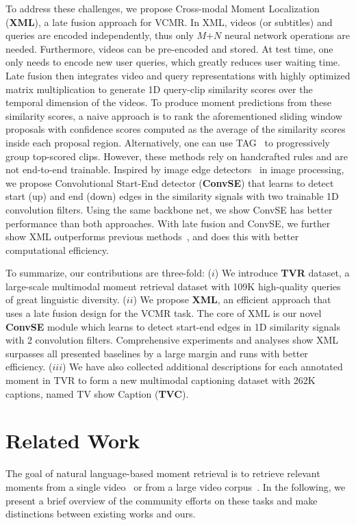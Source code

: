 \documentclass[runningheads]{llncs}
\begin{document}
To address these challenges, we propose Cross-modal Moment Localization (\textbf{XML}), a late fusion approach for VCMR. In XML, videos (or subtitles) and queries are encoded independently, thus only $M\mbox{+}N$ neural network operations are needed. 
Furthermore, videos can be pre-encoded and stored. At test time, one only needs to encode new user queries, which greatly reduces user waiting time. Late fusion then integrates video and query representations with highly optimized matrix multiplication to generate 1D query-clip similarity scores over the temporal dimension of the videos. To produce moment predictions from these similarity scores, a naive approach is to rank the aforementioned sliding window proposals with confidence scores computed as the average of the similarity scores inside each proposal region. 
Alternatively, one can use TAG~\cite{zhao2017temporal} to progressively group top-scored clips. 
However, these methods rely on handcrafted rules and are not end-to-end trainable.
Inspired by image edge detectors~\cite{szeliski2010computer} in image processing, we propose Convolutional Start-End detector (\textbf{ConvSE}) that learns to detect start (up) and end (down) edges in the similarity signals with two trainable 1D convolution filters. 
Using the same backbone net, we show ConvSE has better performance than both approaches.
With late fusion and ConvSE, we further show XML outperforms previous methods~\cite{anne2017localizing,escorcia2019temporal,ghosh2019excl}, and does this with better computational efficiency. 


To summarize, our contributions are three-fold: 
($i$) We introduce \textbf{TVR} dataset, a large-scale multimodal moment retrieval dataset with 109K high-quality queries of great linguistic diversity.
($ii$) We propose \textbf{XML}, an efficient approach that uses a late fusion design for the VCMR task. The core of XML is our novel \textbf{ConvSE} module which learns to detect start-end edges in 1D similarity signals with 2 convolution filters. Comprehensive experiments and analyses show XML surpasses all presented baselines by a large margin and runs with better efficiency. 
($iii$) We have also collected additional descriptions for each annotated moment in TVR to form a new multimodal captioning dataset with 262K captions, named TV show Caption (\textbf{TVC}).
 \section{Related Work}\label{related_work}
The goal of natural language-based moment retrieval is to retrieve relevant moments from a single video~\cite{anne2017localizing,gao2017tall} or from a large video corpus~\cite{escorcia2019temporal}. 
In the following, we present a brief overview of the community efforts on these tasks and make distinctions between existing works and ours.
\end{document}
